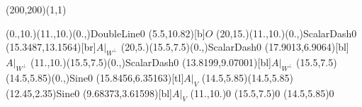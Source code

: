 \unitlength=1bp%

\begin{feynartspicture}(200,200)(1,1)

\FADiagram{}
\FAProp(0.,10.)(11.,10.)(0.,){DoubleLine}{0}
\FALabel(5.5,10.82)[b]{$O$}
\FAProp(20,15.)(11.,10.)(0.,){ScalarDash}{0}
\FALabel(15.3487,13.1564)[br]{$A|_{W^\perp}$}
\FAProp(20,5.)(15.5,7.5)(0.,){ScalarDash}{0}
\FALabel(17.9013,6.9064)[bl]{$A|_{W^\perp}$}
\FAProp(11.,10.)(15.5,7.5)(0.,){ScalarDash}{0}
\FALabel(13.8199,9.07001)[bl]{$A|_{W^\perp}$}
\FAProp(15.5,7.5)(14.5,5.85)(0.,){Sine}{0}
\FALabel(15.8456,6.35163)[tl]{$A|_V$}
\FAProp(14.5,5.85)(14.5,5.85)(12.45,2.35){Sine}{0}
\FALabel(9.68373,3.61598)[bl]{$A|_V$}
\FAVert(11.,10.){0}
\FAVert(15.5,7.5){0}
\FAVert(14.5,5.85){0}
\end{feynartspicture}

